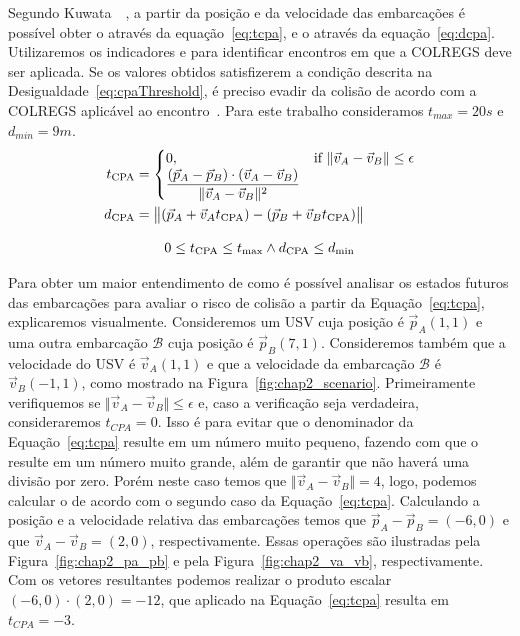         Segundo Kuwata~\etal~\cite{Kuwata2014Safe}, a partir da posição \pos e da velocidade \vel das embarcações é possível obter o \tcpa através da equação~\eqref{eq:tcpa}, e o \dcpa através da equação~\eqref{eq:dcpa}. Utilizaremos os indicadores \tcpa e \dcpa para identificar encontros em que a COLREGS deve ser aplicada. Se os valores obtidos satisfizerem a condição descrita na Desigualdade~\eqref{eq:cpaThreshold}, é preciso evadir da colisão de acordo com a COLREGS aplicável ao encontro~\cite{Kuwata2014Safe}. Para este trabalho consideramos $t_{max} = 20s$ e $d_{min} = 9m$.
        \begin{align}
            t_{\rm CPA} &=
            \begin{cases}
                0, & \text{if } \Vert\vec{v}_{A}-\vec{v}_{B}\Vert\leq\epsilon\\
                \displaystyle{{(\vec{p}_{A}-\vec{p}_{B})\cdot(\vec{v}_{A}-\vec{v}_{B})}\over{\Vert\vec{v}_{A}-\vec{v}_{B}\Vert^{2}}}
            \end{cases}\label{eq:tcpa}\\
            d_{\rm CPA} &=\bigl\Vert (\vec{p}_{A}+\vec{v}_{A}t_{\rm CPA})-(\vec{p}_{B}+\vec{v}_{B}t_{\rm CPA})\bigr\Vert\label{eq:dcpa}
        \end{align}
        
        \begin{equation}\label{eq:cpaThreshold}
            0\leq t_{\rm CPA}\leq t_{\max} \land d_{\rm CPA}\leq d_{\min}
        \end{equation}
    
        Para obter um maior entendimento de como é possível analisar os estados futuros das embarcações para avaliar o risco de colisão a partir da Equação~\ref{eq:tcpa}, explicaremos visualmente. Consideremos um USV cuja posição é $\vec{p}_{A}(1,1)$ e uma outra embarcação $\mathcal{B}$ cuja posição é $\vec{p}_{B}(7,1)$. Consideremos também que a velocidade do USV é $\vec{v}_{A}(1,1)$ e que a velocidade da embarcação $\mathcal{B}$ é $\vec{v}_{B}(-1,1)$, como mostrado na Figura~\ref{fig:chap2_scenario}.
        Primeiramente verifiquemos se $\Vert\vec{v}_{A}-\vec{v}_{B}\Vert\leq\epsilon$ e, caso a verificação seja verdadeira, consideraremos $t_{CPA} = 0$. Isso é para evitar que o denominador da Equação~\ref{eq:tcpa} resulte em um número muito pequeno, fazendo com que o \tcpa resulte em um número muito grande, além de garantir que não haverá uma divisão por zero. Porém neste caso temos que $\Vert\vec{v}_{A}-\vec{v}_{B}\Vert = 4$, logo, podemos calcular o \tcpa de acordo com o segundo caso da Equação~\ref{eq:tcpa}. Calculando a posição e a velocidade relativa das embarcações temos que $\vec{p}_{A}-\vec{p}_{B} = (-6,0)$ e que $\vec{v}_{A}-\vec{v}_{B} = (2,0)$, respectivamente. Essas operações são ilustradas pela Figura~\ref{fig:chap2_pa_pb} e pela Figura~\ref{fig:chap2_va_vb}, respectivamente. Com os vetores resultantes podemos realizar o produto escalar $(-6,0)\cdot(2,0) = -12$, que aplicado na Equação~\ref{eq:tcpa} resulta em $t_{CPA} = -3$.
    
